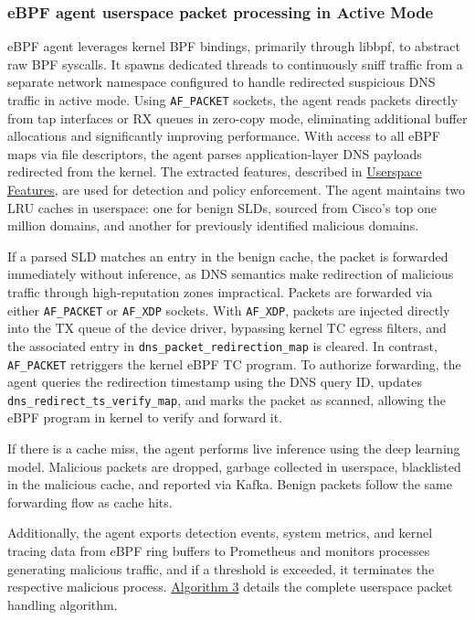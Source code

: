 \documentclass [11pt, proquest] {uwthesis}[2020/02/24]
\begin{document}
\subsubsection{\textbf{eBPF agent userspace packet processing in Active Mode}}
\label{active:sec2}
eBPF agent leverages kernel BPF bindings, primarily through libbpf, to abstract raw BPF syscalls. It spawns dedicated threads to continuously sniff traffic from a separate network namespace configured to handle redirected suspicious DNS traffic in active mode. Using \texttt{AF\_PACKET} sockets, the agent reads packets directly from tap interfaces or RX queues in zero-copy mode, eliminating additional buffer allocations and significantly improving performance. With access to all eBPF maps via file descriptors, the agent parses application-layer DNS payloads redirected from the kernel. The extracted features, described in \hyperref[sec:feature-userspace]{Userspace Features}, are used for detection and policy enforcement. The agent maintains two LRU caches in userspace: one for benign SLDs, sourced from Cisco’s top one million domains, and another for previously identified malicious domains. 

If a parsed SLD matches an entry in the benign cache, the packet is forwarded immediately without inference, as DNS semantics make redirection of malicious traffic through high-reputation zones impractical. Packets are forwarded via either \texttt{AF\_PACKET} or \texttt{AF\_XDP} sockets. With \texttt{AF\_XDP}, packets are injected directly into the TX queue of the device driver, bypassing kernel TC egress filters, and the associated entry in \texttt{dns\_packet\_redirection\_map} is cleared. In contrast, \texttt{AF\_PACKET} retriggers the kernel eBPF TC program. To authorize forwarding, the agent queries the redirection timestamp using the DNS query ID, updates \texttt{dns\_redirect\_ts\_verify\_map}, and marks the packet as scanned, allowing the eBPF program in kernel to verify and forward it.

If there is a cache miss, the agent performs live inference using the deep learning model. Malicious packets are dropped, garbage collected in userspace, blacklisted in the malicious cache, and reported via Kafka. Benign packets follow the same forwarding flow as cache hits.

Additionally, the agent exports detection events, system metrics, and kernel tracing data from eBPF ring buffers to Prometheus and monitors processes generating malicious traffic, and if a threshold is exceeded, it terminates the respective malicious process. \hyperref[sec:alg3]{Algorithm 3} details the complete userspace packet handling algorithm.
\end{document}
